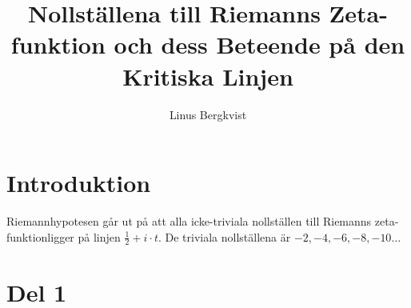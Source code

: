 \documentclass{article}%
\begin{document}
\title{Nollställena till Riemanns Zeta-funktion och dess Beteende på den Kritiska Linjen}
\author{Linus Bergkvist}
\date{}
\maketitle
\noindent
\section*{Introduktion}
	Riemannhypotesen går ut på att alla icke-triviala nollställen till Riemanns
	zeta-funktionligger på linjen $\frac 1 2 + i \cdot t$. De triviala
	nollställena är $-2, -4, -6, -8, -10 \ldots$

\pagebreak
\section*{Del 1}
\end{document}
